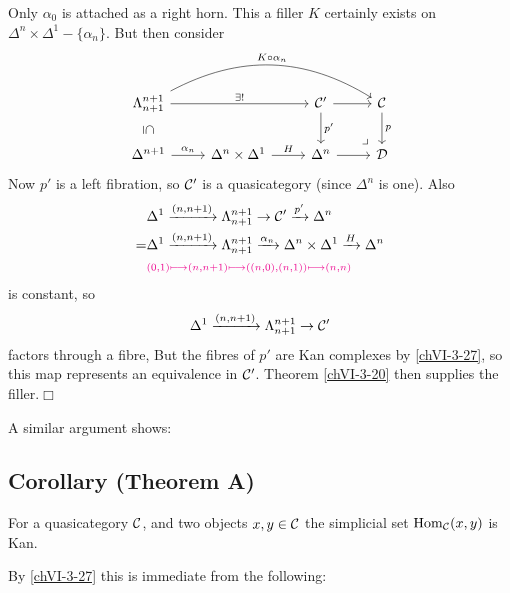         Only $\alpha_0$ is attached as a right horn. This a filler $K$ certainly exists on $\Delta^n \times \Delta^1 - \{ \alpha_n\}$. But then consider
        \begin{equation*}
            \begin{tikzcd}
                \horn{n+1}{n+1} \arrow[d, phantom, "\subseteq" rotate=-90] \arrow[rr, "\exists !"] \arrow[rrr, bend left, "K \circ \alpha_n"]& & \Cc' \arrow[d, "p'"] \arrow[r] \arrow[rd, phantom, "\lrcorner", very near end] & \Cc \arrow[d, "p"] \\
                \Delta^{n+1} \arrow[r, "\alpha_n"] & \Delta^n \times \Delta^1 \arrow[r, "H"] & \Delta^n \arrow[r] & \Dd 
            \end{tikzcd}	
        \end{equation*}
        Now $p'$ is a left fibration, so $\mathcal{C}'$ is a quasicategory (since $\Delta^n$ is one). Also
        \begin{align*}
            &\Delta^1 \xrightarrow{(n , n+1)} \Lambda^{n+1}_{n+1} \rightarrow \mathcal{C}' \xrightarrow{p'} \Delta^n \\
            = &\Delta^1 \xrightarrow{(n, n+1)} \Lambda^{n+1}_{n+1} \xrightarrow{\alpha_n} \Delta^n \times \Delta^1 \xrightarrow{H} \Delta^n \\
            &{\color{magenta} \scriptstyle (0, 1) \longmapsto (n, n+1) \longmapsto ((n,0),(n,1)) \longmapsto (n, n)}
        \end{align*}
        is constant, so
        \begin{equation*}
            \Delta^1 \xrightarrow{(n, n+1)} \Lambda^{n+1}_{n+1} \rightarrow \mathcal{C}'
        \end{equation*}
        factors through a fibre, But the fibres of $p'$ are Kan complexes by \ref{chVI-3-27}, so this map represents an equivalence in $\mathcal{C}'$. Theorem \ref{chVI-3-20} then supplies the filler.\hfill$\Box$
        \medskip
        
        A similar argument shows:

    \subsection{Corollary (Theorem A)}\label{chVI-3-30}
        For a quasicategory $\mathcal{C}$, and two objects $x, y \in \mathcal{C}$ the simplicial set $\operatorname{Hom}_{\mathcal{C}}(x, y)$ is Kan.
        \medskip

        By \ref{chVI-3-27} this is immediate from the following:

